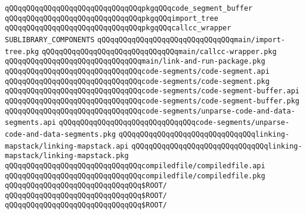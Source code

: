 \verb|qQQqqQQqqQQqqQQqqQQqqQQqqQQqqQQqpkgqQQqcode_segment_buffer|\newline
\newline
\newline
\verb|qQQqqQQqqQQqqQQqqQQqqQQqqQQqqQQqpkgqQQqimport_tree|\newline
\verb|qQQqqQQqqQQqqQQqqQQqqQQqqQQqqQQqpkgqQQqcallcc_wrapper|\newline
\newline
\newline
\newline
\verb|SUBLIBRARY_COMPONENTS|\newline
\verb|qQQqqQQqqQQqqQQqqQQqqQQqqQQqqQQqmain/import-tree.pkg|\newline
\verb|qQQqqQQqqQQqqQQqqQQqqQQqqQQqqQQqmain/callcc-wrapper.pkg|\newline
\verb|qQQqqQQqqQQqqQQqqQQqqQQqqQQqqQQqmain/link-and-run-package.pkg|\newline
\newline
\verb|qQQqqQQqqQQqqQQqqQQqqQQqqQQqqQQqcode-segments/code-segment.api|\newline
\verb|qQQqqQQqqQQqqQQqqQQqqQQqqQQqqQQqcode-segments/code-segment.pkg|\newline
\newline
\verb|qQQqqQQqqQQqqQQqqQQqqQQqqQQqqQQqcode-segments/code-segment-buffer.api|\newline
\verb|qQQqqQQqqQQqqQQqqQQqqQQqqQQqqQQqcode-segments/code-segment-buffer.pkg|\newline
\newline
\verb|qQQqqQQqqQQqqQQqqQQqqQQqqQQqqQQqcode-segments/unparse-code-and-data-segments.api|\newline
\verb|qQQqqQQqqQQqqQQqqQQqqQQqqQQqqQQqcode-segments/unparse-code-and-data-segments.pkg|\newline
\newline
\verb|qQQqqQQqqQQqqQQqqQQqqQQqqQQqqQQqlinking-mapstack/linking-mapstack.api|\newline
\verb|qQQqqQQqqQQqqQQqqQQqqQQqqQQqqQQqlinking-mapstack/linking-mapstack.pkg|\newline
\newline
\verb|qQQqqQQqqQQqqQQqqQQqqQQqqQQqqQQqcompiledfile/compiledfile.api|\newline
\verb|qQQqqQQqqQQqqQQqqQQqqQQqqQQqqQQqcompiledfile/compiledfile.pkg|\newline
\newline
\verb|qQQqqQQqqQQqqQQqqQQqqQQqqQQqqQQq$ROOT/|\newline
\verb|qQQqqQQqqQQqqQQqqQQqqQQqqQQqqQQq$ROOT/|\newline
\verb|qQQqqQQqqQQqqQQqqQQqqQQqqQQqqQQq$ROOT/|\newline


